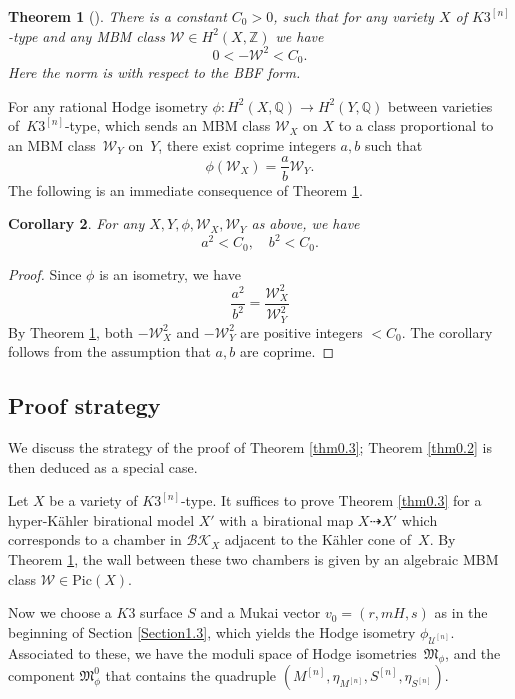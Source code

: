 \documentclass[11pt]{amsart}
\theoremstyle{plain}
\newtheorem{thm}{Theorem}[section]
\newtheorem{cor}[thm]{Corollary}
\theoremstyle{definition}
\theoremstyle{remark}
\newcommand{\BQ}{{\mathbb{Q}}}
\newcommand{\BZ}{{\mathbb{Z}}}
\newcommand{\CU}{{\mathcal U}}
\newcommand{\CW}{{\mathcal W}}
\newcommand{\FM}{{\mathfrak{M}}}
\begin{document}
\begin{thm}[\cite{BHT, AV}]\label{thm1.6}
There is a constant $C_0 >0$, such that for any variety $X$ of $K3^{[n]}$-type and any MBM class $\CW \in H^2(X, \BZ)$ we have
\[
0 < -\CW^2 < C_0. 
\]
Here the norm is with respect to the BBF form.  
\end{thm}

For any rational Hodge isometry $\phi: H^2(X,\BQ) \to H^2(Y,\BQ)$ between varieties of~$K3^{[n]}$-type, which sends an MBM class $\CW_X$ on $X$ to a class proportional to an MBM class~$\CW_Y$ on~$Y$, there exist coprime integers $a,b$ such that
\[
\phi(\CW_X) = \frac{a}{b} \CW_Y.
\]
The following is an immediate consequence of Theorem \ref{thm1.6}.

\begin{cor}\label{cor1.7}
    For any $X,Y, \phi, \CW_X, \CW_Y$ as above, we have
    \[
    a^2 < C_0, \quad b^2 < C_0.
    \]
\end{cor}

\begin{proof}
    Since $\phi$ is an isometry, we have
    \[
    \frac{a^2}{b^2} = \frac{\CW_X^2}{\CW_Y^2}
    \]
    By Theorem \ref{thm1.6}, both $-\CW_X^2$ and $-\CW_Y^2$ are positive integers $< C_0$. The corollary follows from the assumption that $a,b$ are coprime.
\end{proof}



\subsection{Proof strategy}\label{Sec1.5}
We discuss the strategy of the proof of Theorem \ref{thm0.3}; Theorem \ref{thm0.2} is then deduced as a special case. 

Let $X$ be a variety of $K3^{[n]}$-type. It suffices to prove Theorem \ref{thm0.3} for a hyper-K\"ahler birational model $X'$ with a birational map $X \dashrightarrow X'$ which corresponds to a chamber in $\mathcal{BK}_X$ adjacent to the K\"ahler cone of~$X$. By Theorem \ref{thm1.6}, the wall between these two chambers is given by an algebraic MBM class $\CW \in \mathrm{Pic}(X)$.

Now we choose a $K3$ surface $S$ and a Mukai vector $v_0=(r,mH,s)$ as in the beginning of Section \ref{Section1.3}, which yields the Hodge isometry $\phi_{\CU^{[n]}}$. Associated to these, we have the moduli space of Hodge isometries~$\FM_{\phi}$, and the component $\FM^0_\phi$ that contains the quadruple $(M^{[n]}, \eta_{M^{[n]}}, S^{[n]}, \eta_{S^{[n]}})$. 
\end{document}

